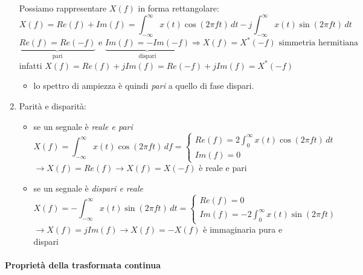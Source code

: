 \documentclass[
]{article}
\providecommand{\tightlist}{%
  \setlength{\itemsep}{0pt}\setlength{\parskip}{0pt}}
\begin{document}
\begin{enumerate}
  Possiamo rappresentare \(X(f)\) in forma rettangolare: \[
  X(f) = Re(f) + Im(f) = \int_{-\infty}^\infty x(t) \cos(2\pi ft) \,dt - j\int_{-\infty}^\infty x(t) \sin(2\pi ft) \,dt
  \] \[
  \underbrace{Re(f)=Re(-f)}_{\text{pari}} \text{ e } \underbrace{Im(f)=-Im(-f)}_{\text{dispari}} \Longrightarrow X(f)=X^{*}(-f) \text{ simmetria hermitiana}
  \] infatti \(X(f)=Re(f)+jIm(f)=Re(-f)+jIm(f)=X^{*}(-f)\)

  \begin{itemize}
  \tightlist
  \item
    lo spettro di ampiezza è quindi \emph{pari} a quello di fase
    dispari.
  \end{itemize}
\item
  Parità e disparità:

  \begin{itemize}
  \tightlist
  \item
    se un segnale è \emph{reale e pari} \[
    X(f) = \int_{-\infty}^\infty x(t) \cos(2\pi ft) \,df=
    \left\{ \begin{array}{cl}
    Re(f) = 2\int_{0}^\infty x(t) \cos(2\pi ft) \,dt \\
    Im(f) = 0
    \end{array} \right.
    \] \(\to X(f) = Re(f) \to X(f)=X(-f)\) è reale e pari
  \item
    se un segnale è \emph{dispari e reale} \[
    X(f) = - \int_{-\infty}^\infty x(t) \sin(2\pi ft) \,dt=
    \left\{ \begin{array}{cl}
    Re(f) = 0 \\
    Im(f) = -2\int_{0}^\infty x(t) \sin(2\pi ft) 
    \end{array} \right.
    \] \(\to X(f)=jIm(f) \to X(f)=-X(f)\) è immaginaria pura e dispari
  \end{itemize}
\end{enumerate}

\paragraph{Proprietà della trasformata
continua}\label{proprietuxe0-della-trasformata-continua}
\end{document}
